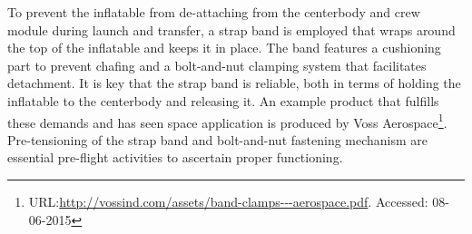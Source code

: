 To prevent the inflatable from de-attaching from the centerbody and crew module during launch and transfer, a strap band is employed that wraps around the top of the inflatable and keeps it in place. The band features a cushioning part to prevent chafing and a bolt-and-nut clamping system that facilitates detachment. It is key that the strap band is reliable, both in terms of holding the inflatable to the centerbody and releasing it. An example product that fulfills these demands and has seen space application is produced by Voss Aerospace\footnote{URL:\url{http://vossind.com/assets/band-clamps---aerospace.pdf}. Accessed: 08-06-2015}. Pre-tensioning of the strap band and bolt-and-nut fastening mechanism are essential pre-flight activities to ascertain proper functioning.

